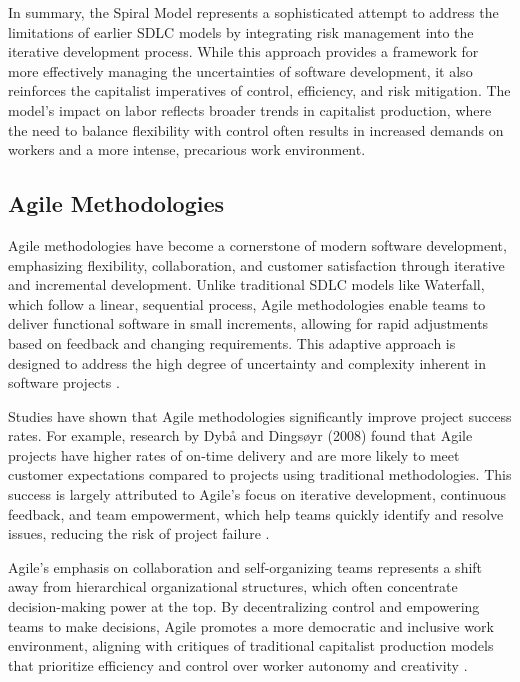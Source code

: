 \begin{refsection}
In summary, the Spiral Model represents a sophisticated attempt to address the limitations of earlier SDLC models by integrating risk management into the iterative development process. While this approach provides a framework for more effectively managing the uncertainties of software development, it also reinforces the capitalist imperatives of control, efficiency, and risk mitigation. The model’s impact on labor reflects broader trends in capitalist production, where the need to balance flexibility with control often results in increased demands on workers and a more intense, precarious work environment.

\subsection{Agile Methodologies}

Agile methodologies have become a cornerstone of modern software development, emphasizing flexibility, collaboration, and customer satisfaction through iterative and incremental development. Unlike traditional SDLC models like Waterfall, which follow a linear, sequential process, Agile methodologies enable teams to deliver functional software in small increments, allowing for rapid adjustments based on feedback and changing requirements. This adaptive approach is designed to address the high degree of uncertainty and complexity inherent in software projects \cite[pp.~833-859]{dyba2008empirical}.

Studies have shown that Agile methodologies significantly improve project success rates. For example, research by Dybå and Dingsøyr (2008) found that Agile projects have higher rates of on-time delivery and are more likely to meet customer expectations compared to projects using traditional methodologies. This success is largely attributed to Agile’s focus on iterative development, continuous feedback, and team empowerment, which help teams quickly identify and resolve issues, reducing the risk of project failure \cite[pp.~833-859]{dyba2008empirical}.

Agile's emphasis on collaboration and self-organizing teams represents a shift away from hierarchical organizational structures, which often concentrate decision-making power at the top. By decentralizing control and empowering teams to make decisions, Agile promotes a more democratic and inclusive work environment, aligning with critiques of traditional capitalist production models that prioritize efficiency and control over worker autonomy and creativity \cite[pp.~19-25]{williams2000strengthening}.


\end{refsection}
